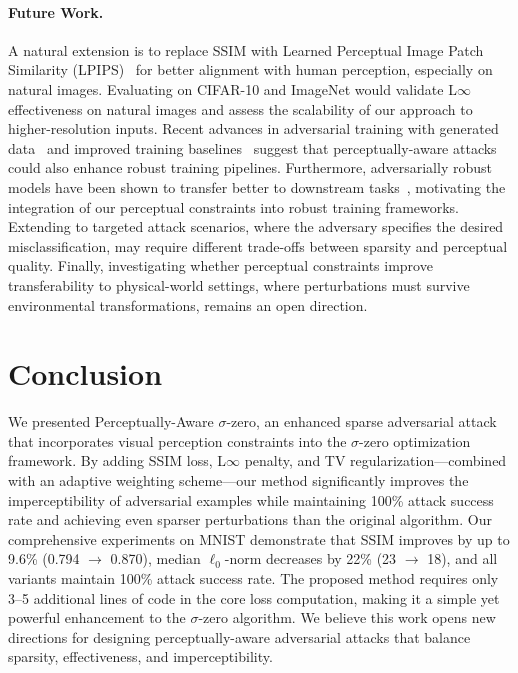 \paragraph{Future Work.} A natural extension is to replace SSIM with Learned Perceptual Image Patch Similarity (LPIPS)~\cite{zhang2018unreasonable} for better alignment with human perception, especially on natural images. Evaluating on CIFAR-10 and ImageNet would validate L$\infty$ effectiveness on natural images and assess the scalability of our approach to higher-resolution inputs. Recent advances in adversarial training with generated data~\cite{gowal2021improving} and improved training baselines~\cite{tramer2020free} suggest that perceptually-aware attacks could also enhance robust training pipelines. Furthermore, adversarially robust models have been shown to transfer better to downstream tasks~\cite{salman2020transfer}, motivating the integration of our perceptual constraints into robust training frameworks. Extending to targeted attack scenarios, where the adversary specifies the desired misclassification, may require different trade-offs between sparsity and perceptual quality. Finally, investigating whether perceptual constraints improve transferability to physical-world settings, where perturbations must survive environmental transformations, remains an open direction.

\section{Conclusion}
\label{sec:conclusion}

We presented Perceptually-Aware $\sigma$-zero, an enhanced sparse adversarial attack that incorporates visual perception constraints into the $\sigma$-zero optimization framework. By adding SSIM loss, L$\infty$ penalty, and TV regularization---combined with an adaptive weighting scheme---our method significantly improves the imperceptibility of adversarial examples while maintaining 100\% attack success rate and achieving even sparser perturbations than the original algorithm. Our comprehensive experiments on MNIST demonstrate that SSIM improves by up to 9.6\% (0.794 $\to$ 0.870), median $\ell_0$-norm decreases by 22\% (23 $\to$ 18), and all variants maintain 100\% attack success rate. The proposed method requires only 3--5 additional lines of code in the core loss computation, making it a simple yet powerful enhancement to the $\sigma$-zero algorithm. We believe this work opens new directions for designing perceptually-aware adversarial attacks that balance sparsity, effectiveness, and imperceptibility.
